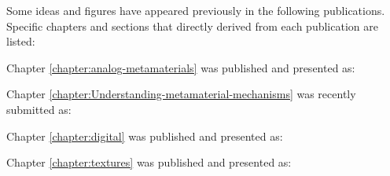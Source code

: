 
\noindent 
Some ideas and figures have appeared previously in the following publications. Specific chapters and sections that directly derived from each publication are listed:

Chapter \ref{chapter:analog-metamaterials} was published and presented as: 

Chapter \ref{chapter:Understanding-metamaterial-mechanisms} was recently submitted as: 

Chapter \ref{chapter:digital} was published and presented as: 

Chapter \ref{chapter:textures} was published and presented as: 


